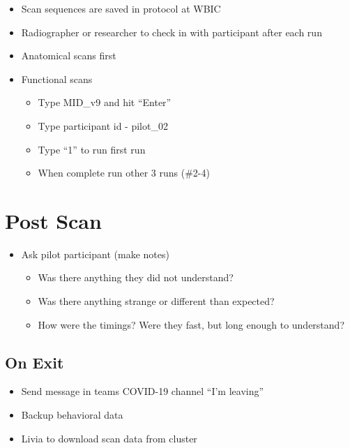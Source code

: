 \documentclass[
]{book}
\providecommand{\tightlist}{%
  \setlength{\itemsep}{0pt}\setlength{\parskip}{0pt}}
\begin{document}
\begin{itemize}
\tightlist
\item
  Scan sequences are saved in protocol at WBIC
\item
  Radiographer or researcher to check in with participant after each run
\item
  Anatomical scans first
\item
  Functional scans

  \begin{itemize}
  \tightlist
  \item
    Type MID\_v9 and hit ``Enter''
  \item
    Type participant id - pilot\_02
  \item
    Type ``1'' to run first run
  \item
    When complete run other 3 runs (\#2-4)
  \end{itemize}
\end{itemize}

\hypertarget{post-scan}{%
\section{Post Scan}\label{post-scan}}

\begin{itemize}
\tightlist
\item
  Ask pilot participant (make notes)

  \begin{itemize}
  \tightlist
  \item
    Was there anything they did not understand?
  \item
    Was there anything strange or different than expected?
  \item
    How were the timings? Were they fast, but long enough to understand?
  \end{itemize}
\end{itemize}

\hypertarget{on-exit}{%
\subsection{On Exit}\label{on-exit}}

\begin{itemize}
\tightlist
\item
  Send message in teams COVID-19 channel ``I'm leaving''
\item
  Backup behavioral data
\item
  Livia to download scan data from cluster
\end{itemize}
\end{document}
